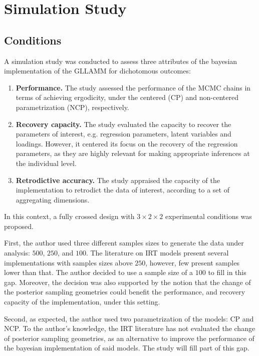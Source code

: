 \chapter{Simulation Study} \label{chap:simulation}

\section{Conditions} \label{sec:conditions}

A simulation study was conducted to assess three attributes of the bayesian implementation of the GLLAMM for dichotomous outcomes:
%
\begin{enumerate}
	\item \textbf{Performance.} The study assessed the performance of the MCMC chains in terms of achieving ergodicity, under the centered (CP) and non-centered parametrization (NCP), respectively.
	\item \textbf{Recovery capacity.} The study evaluated the capacity to recover the parameters of interest, e.g. regression parameters, latent variables and loadings. However, it centered its focus on the recovery of the regression parameters, as they are highly relevant for making appropriate inferences at the individual level.
	\item \textbf{Retrodictive accuracy.} The study appraised the capacity of the implementation to retrodict the data of interest, according to a set of aggregating dimensions.
\end{enumerate} 

\noindent In this context, a fully crossed design with $3 \times 2 \times 2$ experimental conditions was proposed. 

First, the author used three different samples sizes to generate the data under analysis: $500$, $250$, and $100$. The literature on IRT models present several implementations with samples sizes above $250$, however, few present samples lower than that. The author decided to use a sample size of a $100$ to fill in this gap. Moreover, the decision was also supported by the notion that the change of the posterior sampling geometries could benefit the performance, and recovery capacity of the implementation, under this setting.

Second, as expected, the author used two parametrization of the models: CP and NCP. To the author's knowledge, the IRT literature has not evaluated the change of posterior sampling geometries, as an alternative to improve the performance of the bayesian implementation of said models. The study will fill part of this gap.

